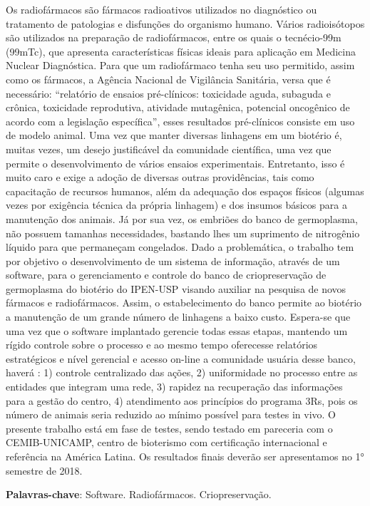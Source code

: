 \documentclass[article,12pt,onesidea,4paper,english,brazil]{abntex2}
\begin{document}
	\noindent Os radiofármacos são fármacos radioativos utilizados no diagnóstico ou tratamento
	de patologias e disfunções do organismo humano. Vários radioisótopos são
	utilizados na preparação de radiofármacos, entre os quais o tecnécio-99m (99mTc),
	que apresenta características físicas ideais para aplicação em Medicina Nuclear
	Diagnóstica. Para que um radiofármaco tenha seu uso permitido, assim como os
	fármacos, a Agência Nacional de Vigilância Sanitária, versa que é necessário:
	“relatório de ensaios pré-clínicos: toxicidade aguda, subaguda e crônica, toxicidade
	reprodutiva, atividade mutagênica, potencial oncogênico de acordo com a legislação
	específica”, esses resultados pré-clínicos consiste em uso de modelo animal. Uma
	vez que manter diversas linhagens em um biotério é, muitas vezes, um desejo
	justificável da comunidade científica, uma vez que permite o desenvolvimento de
	vários ensaios experimentais. Entretanto, isso é muito caro e exige a adoção de
	diversas outras providências, tais como capacitação de recursos humanos, além da
	adequação dos espaços físicos (algumas vezes por exigência técnica da própria
	linhagem) e dos insumos básicos para a manutenção dos animais.
	Já por sua vez, os embriões do banco de germoplasma, não possuem tamanhas
	necessidades, bastando lhes um suprimento de nitrogênio líquido para que
	permaneçam congelados. Dado a problemática, o trabalho tem por objetivo o
	desenvolvimento de um sistema de informação, através de um software, para o
	gerenciamento e controle do banco de criopreservação de germoplasma do biotério
	do IPEN-USP visando auxiliar na pesquisa de novos fármacos e radiofármacos.
	Assim, o estabelecimento do banco permite ao biotério a manutenção de um grande
	número de linhagens a baixo custo. Espera-se que uma vez que o software
	implantado gerencie todas essas etapas, mantendo um rígido controle sobre o
	processo e ao mesmo tempo oferecesse relatórios estratégicos e nível gerencial e
	acesso on-line a comunidade usuária desse banco, haverá : 1) controle centralizado
	das ações, 2) uniformidade no processo entre as entidades que integram uma rede,
	3) rapidez na recuperação das informações para a gestão do centro, 4) atendimento
	aos princípios do programa 3Rs, pois os número de animais seria reduzido ao
	mínimo possível para testes in vivo. O presente trabalho está em fase de testes,
	sendo testado em pareceria com o CEMIB-UNICAMP, centro de bioterismo com
	certificação internacional e referência na América Latina. Os resultados finais
	deverão ser apresentamos no 1° semestre de 2018.
	
	\vspace{\onelineskip}
	
	\noindent
	\textbf{Palavras-chave}: Software. Radiofármacos. Criopreservação.
	
\end{document}
